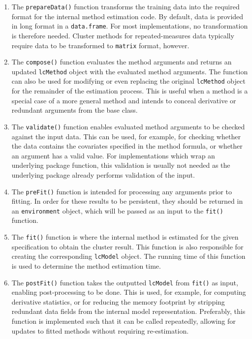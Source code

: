 \begin{enumerate}
\def\labelenumi{\arabic{enumi}.}
\tightlist
\item
  The \texttt{prepareData()} function transforms the training data into the required format for the internal method estimation code. By default, data is provided in long format in a \texttt{data.frame}. For most implementations, no transformation is therefore needed. Cluster methods for repeated-measures data typically require data to be transformed to \texttt{matrix} format, however.
\item
  The \texttt{compose()} function evaluates the method arguments and returns an updated \texttt{lcMethod} object with the evaluated method arguments. The function can also be used for modifying or even replacing the original \texttt{lcMethod} object for the remainder of the estimation process. This is useful when a method is a special case of a more general method and intends to conceal derivative or redundant arguments from the base class.
\item
  The \texttt{validate()} function enables evaluated method arguments to be checked against the input data. This can be used, for example, for checking whether the data contains the covariates specified in the method formula, or whether an argument has a valid value. For implementations which wrap an underlying package function, this validation is usually not needed as the underlying package already performs validation of the input.
\item
  The \texttt{preFit()} function is intended for processing any arguments prior to fitting. In order for these results to be persistent, they should be returned in an \texttt{environment} object, which will be passed as an input to the \texttt{fit()} function.
\item
  The \texttt{fit()} function is where the internal method is estimated for the given specification to obtain the cluster result. This function is also responsible for creating the corresponding \texttt{lcModel} object. The running time of this function is used to determine the method estimation time.
\item
  The \texttt{postFit()} function takes the outputted \texttt{lcModel} from \texttt{fit()} as input, enabling post-processing to be done. This is used, for example, for computing derivative statistics, or for reducing the memory footprint by stripping redundant data fields from the internal model representation. Preferably, this function is implemented such that it can be called repeatedly, allowing for updates to fitted methods without requiring re-estimation.
\end{enumerate}

